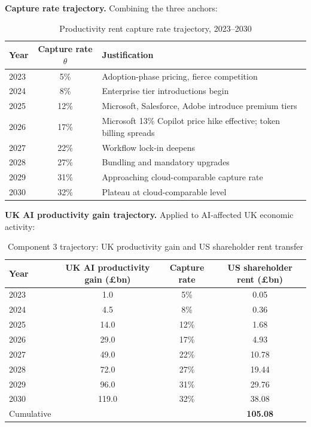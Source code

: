 \documentclass[11pt,letterpaper]{article}
\theoremstyle{remark}
\begin{document}
\textbf{Capture rate trajectory.} Combining the three anchors:

\begin{table}[ht]
\centering
\caption{Productivity rent capture rate trajectory, 2023--2030}
\begin{tabular}{lcl}
\toprule
Year & Capture rate $\theta$ & Justification \\
\midrule
2023 & 5\% & Adoption-phase pricing, fierce competition \\
2024 & 8\% & Enterprise tier introductions begin \\
2025 & 12\% & Microsoft, Salesforce, Adobe introduce premium tiers \\
2026 & 17\% & Microsoft 13\% Copilot price hike effective; token billing spreads \\
2027 & 22\% & Workflow lock-in deepens \\
2028 & 27\% & Bundling and mandatory upgrades \\
2029 & 31\% & Approaching cloud-comparable capture rate \\
2030 & 32\% & Plateau at cloud-comparable level \\
\bottomrule
\end{tabular}
\end{table}

\textbf{UK AI productivity gain trajectory.} Applied to AI-affected UK economic activity:

\begin{table}[ht]
\centering
\caption{Component 3 trajectory: UK productivity gain and US shareholder rent transfer}
\begin{tabular}{lccc}
\toprule
Year & UK AI productivity gain (\pounds bn) & Capture rate & US shareholder rent (\pounds bn) \\
\midrule
2023 & 1.0 & 5\% & 0.05 \\
2024 & 4.5 & 8\% & 0.36 \\
2025 & 14.0 & 12\% & 1.68 \\
2026 & 29.0 & 17\% & 4.93 \\
2027 & 49.0 & 22\% & 10.78 \\
2028 & 72.0 & 27\% & 19.44 \\
2029 & 96.0 & 31\% & 29.76 \\
2030 & 119.0 & 32\% & 38.08 \\
\midrule
Cumulative & & & \textbf{105.08} \\
\bottomrule
\end{tabular}
\end{table}
\end{document}
